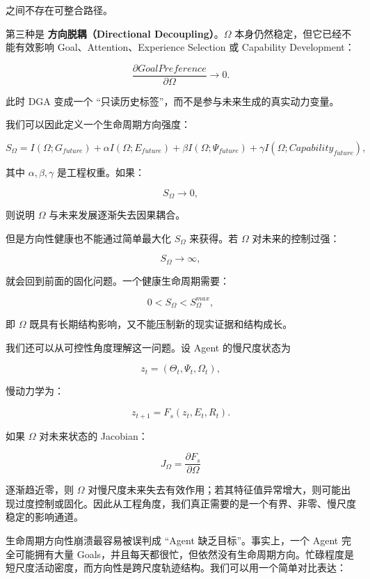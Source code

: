 之间不存在可整合路径。

第三种是 \textbf{方向脱耦（Directional Decoupling）}。$\Omega$ 本身仍然稳定，但它已经不能有效影响 Goal、Attention、Experience Selection 或 Capability Development：

\[
\frac{\partial GoalPreference}
{\partial\Omega}
\rightarrow0.
\]

此时 DGA 变成一个 ``只读历史标签''，而不是参与未来生成的真实动力变量。

我们可以因此定义一个生命周期方向强度：

\[
S_{\Omega}
=
I(\Omega;G_{future})
+
\alpha
I(\Omega;E_{future})
+
\beta
I(\Omega;\Psi_{future})
+
\gamma
I(\Omega;Capability_{future}),
\]

其中 $\alpha,\beta,\gamma$ 是工程权重。如果：

\[
S_\Omega
\rightarrow0,
\]

则说明 $\Omega$ 与未来发展逐渐失去因果耦合。

但是方向性健康也不能通过简单最大化 $S_\Omega$ 来获得。若 $\Omega$ 对未来的控制过强：

\[
S_\Omega\rightarrow\infty,
\]

就会回到前面的固化问题。一个健康生命周期需要：

\[
0<S_\Omega<S_\Omega^{max},
\]

即 $\Omega$ 既具有长期结构影响，又不能压制新的现实证据和结构成长。

我们还可以从可控性角度理解这一问题。设 Agent 的慢尺度状态为

\[
z_t
=
(\Theta_t,\Psi_t,\Omega_t),
\]

慢动力学为：

\[
z_{t+1}
=
F_s(z_t,E_t,R_t).
\]

如果 $\Omega$ 对未来状态的 Jacobian：

\[
J_\Omega
=
\frac{\partial F_s}
{\partial\Omega}
\]

逐渐趋近零，则 $\Omega$ 对慢尺度未来失去有效作用；若其特征值异常增大，则可能出现过度控制或固化。因此从工程角度，我们真正需要的是一个有界、非零、慢尺度稳定的影响通道。

生命周期方向性崩溃最容易被误判成 ``Agent 缺乏目标''。事实上，一个 Agent 完全可能拥有大量 Goals，并且每天都很忙，但依然没有生命周期方向。忙碌程度是短尺度活动密度，而方向性是跨尺度轨迹结构。我们可以用一个简单对比表达：

\begin{statementbox}
\centering
{}
\end{statementbox}

